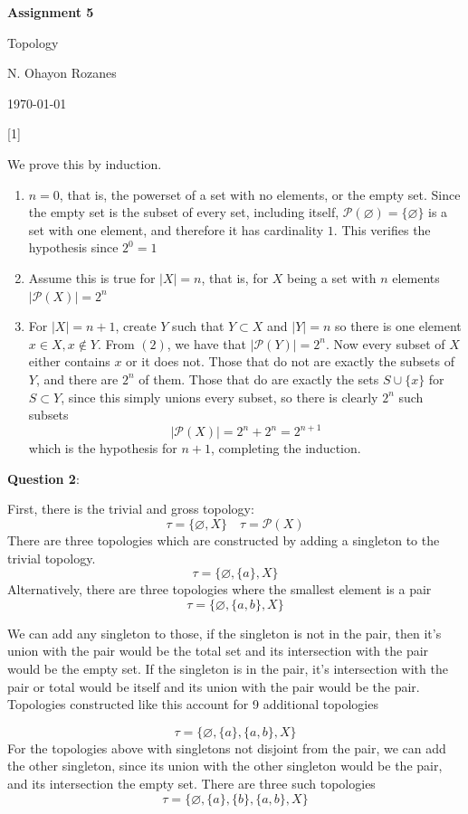 \documentclass{article} %
\newcommand{\question}[2][]{
  \begin{flushleft}
    \textbf{Question #1}: \textit{#2}

\end{flushleft}}
\newcommand{\maketitletwo}[2][]{
  \begin{center}
    \Large{\textbf{Assignment #1}

    Topology} %
    \vspace{5pt}

    \normalsize{N. Ohayon Rozanes  %

    \today}        %
    \vspace{15pt}

\end{center}}
\begin{document}
\maketitletwo[5]  %

\question[1]{}

We prove this by induction.
\begin{enumerate}
  \item $n = 0$, that is, the powerset of a set with no elements, or
    the empty set. Since the empty set is the subset of every set,
    including itself, $\mathcal{P}(\varnothing) = \{\varnothing\}$ is a set with
    one element, and therefore it has cardinality $1$. This verifies
    the hypothesis since $2^0 = 1$
  \item Assume this is true for $|X| = n$, that is, for $X$ being a set
    with $n$ elements $|\mathcal{P}(X)| = 2^n$
  \item For $|X| = n+1$, create $Y$ such that $Y \subset X$ and $|Y|
    = n$ so there is one element $x \in X, x \notin Y$. From $(2)$, we have that
    $|\mathcal{P}(Y)| = 2^n$. Now every subset of $X$ either contains
    $x$ or it does not. Those that do not are exactly the subsets of
    $Y$, and there are $2^n$ of them. Those that do are exactly the
    sets $S \cup \{x\}$ for $S \subset Y$, since this simply unions
    every subset, so there is clearly $2^n$ such subsets
    \[
      |\mathcal{P}(X)| = 2^n + 2^n = 2^{n+1}
    \]
    which is the hypothesis for $n+1$, completing the induction.
\end{enumerate}

\question[2]{}
First, there is the trivial and gross topology:
\[
  \tau = \{\varnothing, X\} \quad \tau = \mathcal{P}(X)
\]
There are three topologies which are constructed by adding a
singleton to the trivial topology.
\[
  \tau = \{\varnothing, \{a\}, X\}
\]
Alternatively, there are three topologies where the smallest element is a pair
\[
  \tau = \{\varnothing, \{a,b\}, X\}
\]

We can add any singleton to those, if the singleton is not in the
pair, then it's union with the pair would be the total set and its
intersection with the pair would be the empty set. If the singleton
is in the pair, it's intersection with the pair or total would be
itself and its union with the pair would be the pair. Topologies
constructed like this account for 9 additional topologies

\[
  \tau = \{\varnothing, \{a\}, \{a, b\}, X\}
\]
For the topologies above with singletons not disjoint from the pair,
we can add the other singleton, since its union with the other
singleton would be the pair, and its intersection the empty set.
There are three such topologies
\[
  \tau = \{\varnothing, \{a\}, \{b\}, \{a,b\}, X\}
\]
\end{document}
